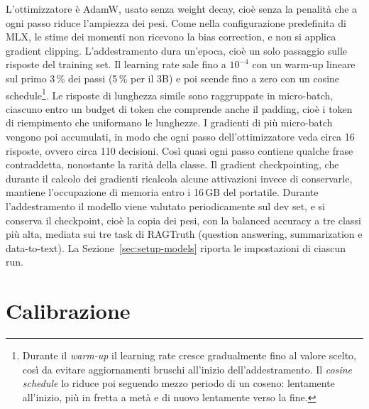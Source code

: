 L'ottimizzatore è AdamW, usato senza weight decay, cioè senza la penalità che a ogni passo riduce l'ampiezza dei pesi.
Come nella configurazione predefinita di MLX, le stime dei momenti non ricevono la bias correction, e non si applica
gradient clipping. L'addestramento dura un'epoca, cioè un solo passaggio sulle risposte del training set. Il learning
rate sale fino a $10^{-4}$ con un warm-up lineare sul primo 3\,\% dei passi (5\,\% per il 3B) e poi scende fino a zero con un cosine
schedule\footnote{Durante il \emph{warm-up} il learning rate cresce gradualmente fino al valore scelto, così da evitare
aggiornamenti bruschi all'inizio dell'addestramento. Il \emph{cosine schedule} lo riduce poi seguendo mezzo periodo di
un coseno: lentamente all'inizio, più in fretta a metà e di nuovo lentamente verso la fine.}. Le risposte di lunghezza
simile sono raggruppate in micro-batch, ciascuno entro un budget di token che comprende anche il padding, cioè i token di
riempimento che uniformano le lunghezze. I gradienti di più micro-batch vengono poi accumulati, in modo che ogni passo
dell'ottimizzatore veda circa 16 risposte, ovvero circa 110 decisioni. Così quasi ogni passo contiene qualche frase contraddetta, nonostante la rarità della classe. Il gradient checkpointing, che durante il calcolo dei gradienti
ricalcola alcune attivazioni invece di conservarle, mantiene l'occupazione di memoria entro i 16\,GB del portatile.
Durante l'addestramento il modello viene valutato periodicamente sul dev set, e si conserva il checkpoint, cioè la copia
dei pesi, con la balanced accuracy a tre classi più alta, mediata sui tre task di RAGTruth (question answering, summarization e data-to-text). La Sezione~\ref{sec:setup-models} riporta
le impostazioni di ciascun run.

\section{Calibrazione}
\label{sec:method-calibration}

